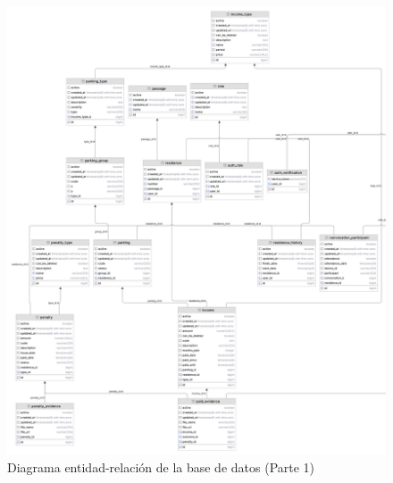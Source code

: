     \begin{figure}[H]
        \centering
        \includegraphics[width=1\textwidth]{resources/images/diagram-1}
        \caption{Diagrama entidad-relación de la base de datos (Parte 1)}
        \label{fig:er-diagram-1}
    \end{figure}

